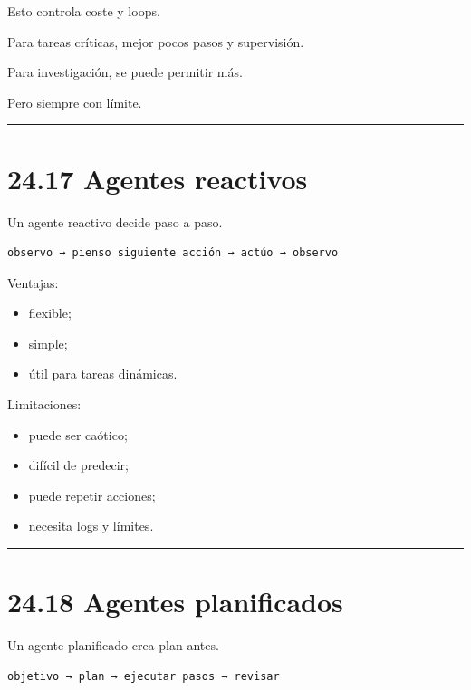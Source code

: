 Esto controla coste y loops.

Para tareas críticas, mejor pocos pasos y supervisión.

Para investigación, se puede permitir más.

Pero siempre con límite.

\begin{center}\rule{0.5\linewidth}{0.5pt}\end{center}

\section{24.17 Agentes reactivos}\label{agentes-reactivos}

Un agente reactivo decide paso a paso.

\begin{lstlisting}
observo → pienso siguiente acción → actúo → observo
\end{lstlisting}

Ventajas:

\begin{itemize}
\tightlist
\item
  flexible;
\item
  simple;
\item
  útil para tareas dinámicas.
\end{itemize}

Limitaciones:

\begin{itemize}
\tightlist
\item
  puede ser caótico;
\item
  difícil de predecir;
\item
  puede repetir acciones;
\item
  necesita logs y límites.
\end{itemize}

\begin{center}\rule{0.5\linewidth}{0.5pt}\end{center}

\section{24.18 Agentes planificados}\label{agentes-planificados}

Un agente planificado crea plan antes.

\begin{lstlisting}
objetivo → plan → ejecutar pasos → revisar
\end{lstlisting}

